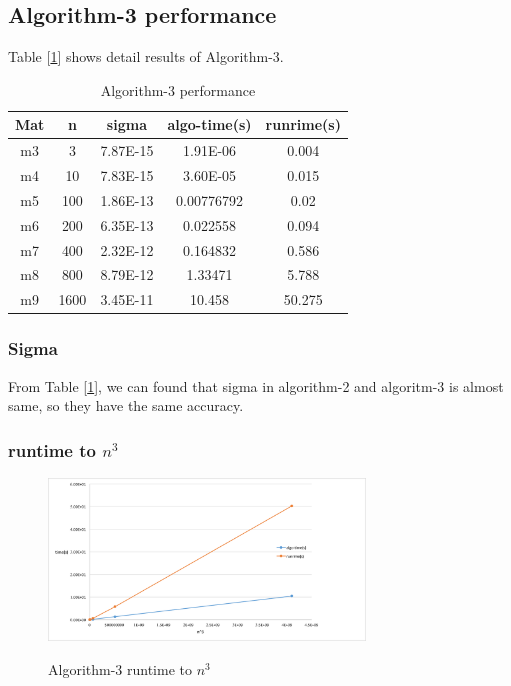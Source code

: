 \documentclass{article}
\begin{document}
\subsection{Algorithm-3 performance}
Table [\ref{tab:algo3}] shows detail results of Algorithm-3.
\begin{table}[htbp]
    \centering
    \caption{Algorithm-3 performance}
    \begin{tabular}{|c|c|c|c|c|}
        \hline
        Mat & \multicolumn{1}{c|}{n} & \multicolumn{1}{c|}{sigma} & \multicolumn{1}{l|}{algo-time(s)} & \multicolumn{1}{c|}{runrime(s)} \bigstrut\\
        \hline
        m3  & 3   & 7.87E-15 & 1.91E-06 & 0.004 \bigstrut\\
        \hline
        m4  & 10  & 7.83E-15 & 3.60E-05 & 0.015 \bigstrut\\
        \hline
        m5  & 100 & 1.86E-13 & 0.00776792 & 0.02 \bigstrut\\
        \hline
        m6  & 200 & 6.35E-13 & 0.022558 & 0.094 \bigstrut\\
        \hline
        m7  & 400 & 2.32E-12 & 0.164832 & 0.586 \bigstrut\\
        \hline
        m8  & 800 & 8.79E-12 & 1.33471 & 5.788 \bigstrut\\
        \hline
        m9  & 1600 & 3.45E-11 & 10.458 & 50.275 \bigstrut\\
        \hline
    \end{tabular}%
    \label{tab:algo3}
\end{table}%
\subsubsection{Sigma}
From Table [\ref{tab:algo3}], we can found that sigma in algorithm-2 and algoritm-3 is almost same, so they have the same accuracy.
\subsubsection{runtime to $n^3$}
\begin{figure}[H]
    \centering
    \caption{Algorithm-3 runtime to $n^3$}
    \includegraphics[width=0.75\textwidth]{src/algo3-runtime.png}
    \label{fig:algo3-runtime}
\end{figure}
\end{document}
